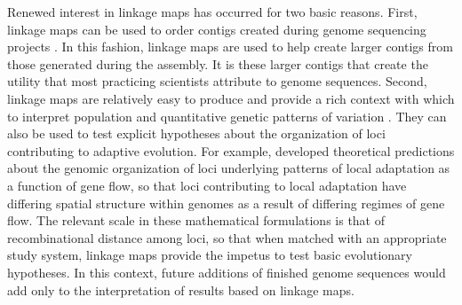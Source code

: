 \documentclass[11pt]{article}
\begin{document}
Renewed interest in linkage maps has occurred for two basic reasons. First, linkage maps can be used to order contigs 
created during genome sequencing projects \citep{Mackay:2012, Martinez-Garcia:2013}. In this fashion, linkage 
maps are used to help create larger contigs from those generated during the assembly. It is these larger contigs that 
create the utility that most practicing scientists attribute to genome sequences. Second, linkage maps are relatively 
easy to produce and provide a rich context with which to interpret population and quantitative genetic patterns of variation 
\citep[e.g.][]{Eckert:2010a, Eckert:2010b, Eckert:2013a, Yeaman:2013}. They can also be used to test explicit hypotheses about 
the organization of loci contributing to adaptive evolution. For example, \citet{Yeaman:2011} developed theoretical 
predictions about the genomic organization of loci underlying patterns of local adaptation as a function of gene flow, 
so that loci contributing to local adaptation have differing spatial structure within genomes as a result of differing 
regimes of gene flow. The relevant scale \citep[\textit{sensu}][]{Houle:2011} in these mathematical formulations is that 
of recombinational distance among loci, so that when matched with an appropriate study system, 
linkage maps provide the impetus to test basic evolutionary hypotheses. In this context, future additions of finished 
genome sequences would add only to the interpretation of results based on linkage maps.
\end{document}
